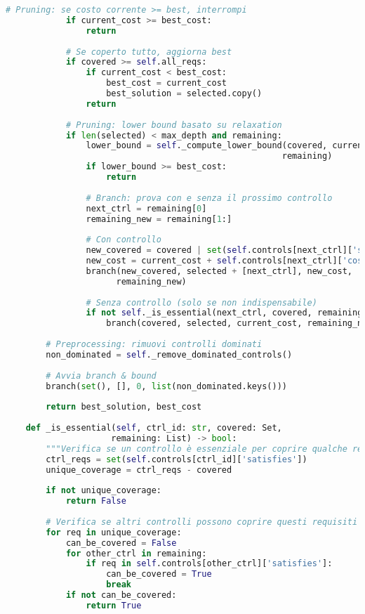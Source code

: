 \begin{lstlisting}[language=Python, caption=Implementazione Weighted Set Cover per Compliance]
            # Pruning: se costo corrente >= best, interrompi
            if current_cost >= best_cost:
                return
            
            # Se coperto tutto, aggiorna best
            if covered >= self.all_reqs:
                if current_cost < best_cost:
                    best_cost = current_cost
                    best_solution = selected.copy()
                return
            
            # Pruning: lower bound basato su relaxation
            if len(selected) < max_depth and remaining:
                lower_bound = self._compute_lower_bound(covered, current_cost, 
                                                       remaining)
                if lower_bound >= best_cost:
                    return
                
                # Branch: prova con e senza il prossimo controllo
                next_ctrl = remaining[0]
                remaining_new = remaining[1:]
                
                # Con controllo
                new_covered = covered | set(self.controls[next_ctrl]['satisfies'])
                new_cost = current_cost + self.controls[next_ctrl]['cost']
                branch(new_covered, selected + [next_ctrl], new_cost, 
                      remaining_new)
                
                # Senza controllo (solo se non indispensabile)
                if not self._is_essential(next_ctrl, covered, remaining_new):
                    branch(covered, selected, current_cost, remaining_new)
        
        # Preprocessing: rimuovi controlli dominati
        non_dominated = self._remove_dominated_controls()
        
        # Avvia branch & bound
        branch(set(), [], 0, list(non_dominated.keys()))
        
        return best_solution, best_cost
    
    def _is_essential(self, ctrl_id: str, covered: Set, 
                     remaining: List) -> bool:
        """Verifica se un controllo è essenziale per coprire qualche requisito"""
        ctrl_reqs = set(self.controls[ctrl_id]['satisfies'])
        unique_coverage = ctrl_reqs - covered
        
        if not unique_coverage:
            return False
        
        # Verifica se altri controlli possono coprire questi requisiti
        for req in unique_coverage:
            can_be_covered = False
            for other_ctrl in remaining:
                if req in self.controls[other_ctrl]['satisfies']:
                    can_be_covered = True
                    break
            if not can_be_covered:
                return True
        

\end{lstlisting}
